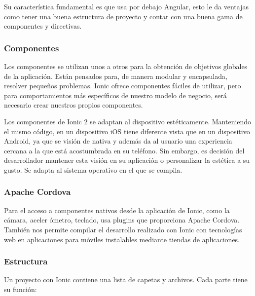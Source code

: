 \documentclass[a4paper, 12pt]{book}
\begin{document}
Su caracter\'istica fundamental es que usa por debajo Angular, esto le da ventajas como tener
una buena estructura de proyecto y contar con una buena gama de componentes y directivas.

\subsubsection{Componentes}
\label{subsec:estilo}

Los componentes se utilizan unos a otros para la obtenci\'on de objetivos globales de la aplicaci\'on. Est\'an pensados para, de manera modular y encapsulada, resolver peque\~nos problemas.
Ionic ofrece componentes f\'aciles de utilizar, pero para comportamientos m\'as espec\'ificos de
nuestro modelo de negocio, ser\'a necesario crear nuestros propios componentes.

Los componentes de Ionic 2 se adaptan al dispositivo est\'eticamente. Manteniendo el mismo
c\'odigo, en un dispositivo iOS tiene diferente vista que en un dispositivo Android, ya que se
visi\'on de nativa y adem\'as da al usuario una experiencia cercana a la que est\'a acostumbrada en
su tel\'efono. Sin embargo, es decisi\'on del desarrollador mantener esta visi\'on en su aplicaci\'on o
personalizar la est\'etica a su gusto.
Se adapta al sistema operativo en el que se compila. 

\subsubsection{Apache Cordova}
\label{subsec:estilo}

Para el acceso a componentes nativos desde la aplicaci\'on de Ionic, como la c\'amara, aceler
\'ometro, teclado, usa plugins que proporciona Apache Cordova. Tambi\'en nos permite compilar
el desarrollo realizado con Ionic con tecnolog\'ias web en aplicaciones para m\'oviles instalables
mediante tiendas de aplicaciones.

\subsubsection{Estructura}
\label{subsec:estilo}

Un proyecto con Ionic contiene una lista de capetas y archivos. Cada parte tiene su funci\'on:
\end{document}
